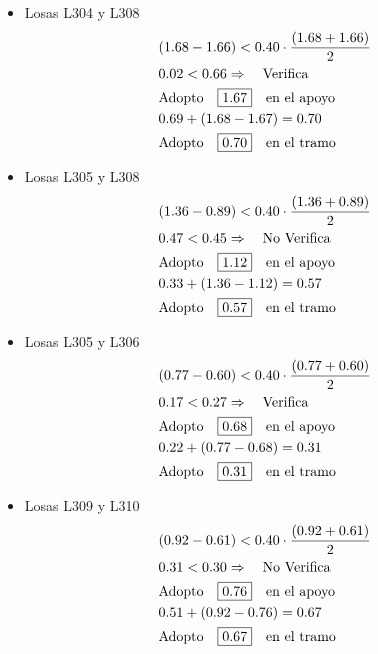 \begin{enumerate}
\begin{itemize}
\item Losas L304 y L308
\begin{align*}
& (1.68-1.66) < 0.40 \cdot \frac{(1.68+1.66)}{2}\\
& 0.02 < 0.66 \Rightarrow \quad \text{Verifica}\\
& \text{Adopto} \quad \framebox{1.67} \quad \text{en el apoyo}\\
& 0.69 + (1.68-1.67) = 0.70\\
& \text{Adopto} \quad \framebox{0.70} \quad \text{en el tramo}\\
\end{align*}

\item Losas L305 y L308
\begin{align*}
& (1.36-0.89) < 0.40 \cdot \frac{(1.36+0.89)}{2}\\
& 0.47 < 0.45 \Rightarrow \quad \text{No Verifica}\\
& \text{Adopto} \quad \framebox{1.12} \quad \text{en el apoyo}\\
& 0.33 + (1.36-1.12) = 0.57\\
& \text{Adopto} \quad \framebox{0.57} \quad \text{en el tramo}\\
\end{align*}

\item Losas L305 y L306
\begin{align*}
& (0.77-0.60) < 0.40 \cdot \frac{(0.77+0.60)}{2}\\
& 0.17 < 0.27 \Rightarrow \quad \text{Verifica}\\
& \text{Adopto} \quad \framebox{0.68} \quad \text{en el apoyo}\\
& 0.22 + (0.77-0.68) = 0.31\\
& \text{Adopto} \quad \framebox{0.31} \quad \text{en el tramo}\\
\end{align*}

\item Losas L309 y L310
\begin{align*}
& (0.92-0.61) < 0.40 \cdot \frac{(0.92+0.61)}{2}\\
& 0.31 < 0.30 \Rightarrow \quad \text{No Verifica}\\
& \text{Adopto} \quad \framebox{0.76} \quad \text{en el apoyo}\\
& 0.51 + (0.92-0.76) = 0.67\\
& \text{Adopto} \quad \framebox{0.67} \quad \text{en el tramo}\\
\end{align*}


\end{itemize}
\end{enumerate}

